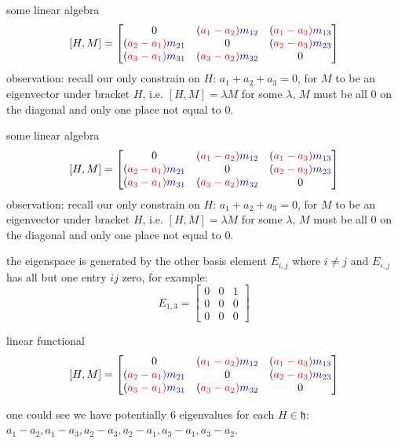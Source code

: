\documentclass{beamer}
\begin{document}
\begin{frame}{some linear algebra}
	\[ [H,M] = \def\a{\color{red}a} \def\m{\color{blue}m} \begin{bmatrix} 0& (\a_1-\a_2)\m_{12} & (\a_1-\a_3)\m_{13} \\ (\a_2-\a_1)\m_{21} & 0& (\a_2-\a_3)\m_{23} \\ (\a_3-\a_1)\m_{31} & (\a_3-\a_2)\m_{32} & 0 \end{bmatrix} \] 
	\def\a{\color{red}a}
	observation: recall our only constrain on $H$:  $a_1+a_2+a_3=0$, for $M$ to be an eigenvector under bracket  $H$, i.e.  $[H,M] = \lambda M$ for some  $\lambda$,  $M$ must be all  $0$ on the diagonal and only one place not equal to  $0$. 


\end{frame}


\begin{frame}{some linear algebra}
	\[ [H,M] = \def\a{\color{red}a} \def\m{\color{blue}m} \begin{bmatrix} 0& (\a_1-\a_2)\m_{12} & (\a_1-\a_3)\m_{13} \\ (\a_2-\a_1)\m_{21} & 0& (\a_2-\a_3)\m_{23} \\ (\a_3-\a_1)\m_{31} & (\a_3-\a_2)\m_{32} & 0 \end{bmatrix} \] 
	\def\a{\color{red}a}
	observation: recall our only constrain on $H$:  $a_1+a_2+a_3=0$, for $M$ to be an eigenvector under bracket  $H$, i.e.  $[H,M] = \lambda M$ for some  $\lambda$,  $M$ must be all  $0$ on the diagonal and only one place not equal to  $0$. 

the eigenspace is generated by the other basis element  $E_{i,j}$ where $i \neq j$ and $E_{i,j}$ has all but one entry $ij$ zero, for example:  \[
		E_{1,3} = \begin{bmatrix} 0 & 0 & 1 \\ 0 & 0 &0 \\ 0 &0 &0 \end{bmatrix} 
	\] 
\end{frame}

\begin{frame}{linear functional}	
	\[ [H,M] = \def\a{\color{red}a} \def\m{\color{blue}m} \begin{bmatrix} 0& (\a_1-\a_2)\m_{12} & (\a_1-\a_3)\m_{13} \\ (\a_2-\a_1)\m_{21} & 0& (\a_2-\a_3)\m_{23} \\ (\a_3-\a_1)\m_{31} & (\a_3-\a_2)\m_{32} & 0 \end{bmatrix} \]

	one could see we have potentially $6$ eigenvalues for each  $H \in \mathfrak{h}$: $a_1-a_2, a_1-a_3, a_2-a_3, a_2-a_1, a_3-a_1, a_3-a_2$. 

\end{frame}
\end{document}
